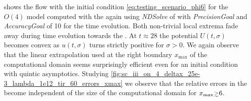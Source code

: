  shows the \frg{} flow with the initial condition \eqref{eq:testing_scenario_phi6} for the $O(4)$ model computed with the \ktScheme{} again using \textit{NDSolve} of \WAMXIIwR{} with \textit{PrecisionGoal} and \textit{AccuracyGoal} of 10 for the \frg{} time evolution.
Both non-trivial local extrema fade away during \frg{} time evolution towards the \ir{}.
At $t \approx 28$ the potential $U ( t, \sigma )$ becomes convex as $u ( t, \sigma )$ turns strictly positive for $\sigma > 0$.
We again observe that the linear extrapolation used at the right boundary $x_\mathrm{max}$ of the computational domain seems surprisingly efficient even for an initial condition with quintic asymptotics.
Studying \cref{fig:sc_iii_on_4_deltax_25e-3_lambda_1e12_tir_60_errors_xmax} we observe that the relative errors in the \ir{} become independent of the size of the computational domain for $x_\mathrm{max}\smallergtrsim 6$.

